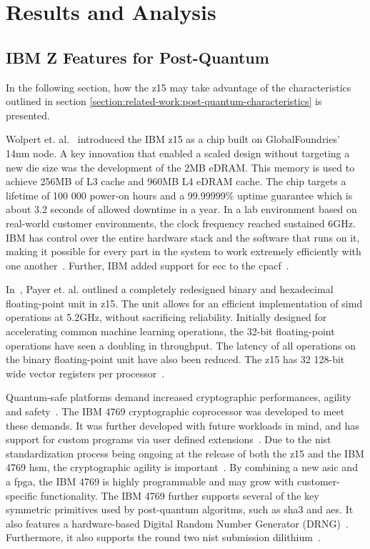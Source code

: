 \chapter{Results and Analysis}
\label{chapter:results}

\section{IBM Z Features for Post-Quantum}
\label{section:results:z15}

In the following section, how the \gls{z15} may take advantage of the characteristics outlined in section \ref{section:related-work:post-quantum-characteristics} is presented.

Wolpert et. al.~\cite{wolpert2020} introduced the IBM \gls{z15} as a chip built on GlobalFoundries' 14nm node. A key innovation that enabled a scaled design without targeting a new die size was the development of the 2MB eDRAM. This memory is used to achieve 256MB of L3 cache and 960MB L4 eDRAM cache. The chip targets a lifetime of 100 000 power-on hours and a 99.99999\% uptime guarantee which is about 3.2 seconds of allowed downtime in a year. In a lab environment based on real-world customer environments, the clock frequency reached sustained 6GHz. IBM has control over the entire hardware stack and the software that runs on it, making it possible for every part in the system to work extremely efficiently with one another~\cite{wolpert2020}. Further, IBM added support for \gls{ecc} to the \gls{cpacf}~\cite{berry2020}.

In~\cite{payer2020}, Payer et. al. outlined a completely redesigned binary and hexadecimal floating-point unit in \gls{z15}. The unit allows for an efficient implementation of \gls{simd} operations at 5.2GHz, without sacrificing reliability. Initially designed for accelerating common machine learning operations, the 32-bit floating-point operations have seen a doubling in throughput. The latency of all operations on the binary floating-point unit have also been reduced. The \gls{z15} has 32 128-bit wide vector registers per processor~\cite{redbook:z15}.

Quantum-safe platforms demand increased cryptographic performances, agility and safety~\cite{busby2020}. The IBM 4769 cryptographic coprocessor was developed to meet these demands. It was further developed with future workloads in mind, and has support for custom programs via user defined extensions~\cite{busby2020, ibm:4769}. Due to the \gls{nist} standardization process being ongoing at the release of both the \gls{z15} and the IBM 4769 \gls{hsm}, the cryptographic agility is important~\cite{microsoft2020, ibm:z15:2019}. By combining a new \gls{asic} and a \gls{fpga}, the IBM 4769 is highly programmable and may grow with customer-specific functionality. The IBM 4769 further supports several of the key symmetric primitives used by \gls{post-quantum} algoritms, such as \gls{sha3} and \gls{aes}. It also features a hardware-based Digital Random Number Generator (DRNG)~\cite{ibm:4769:ep11}. Furthermore, it also supports the round two \gls{nist} submission \gls{dilithium}~\cite{ibm:4769:ep11, busby2020}.

